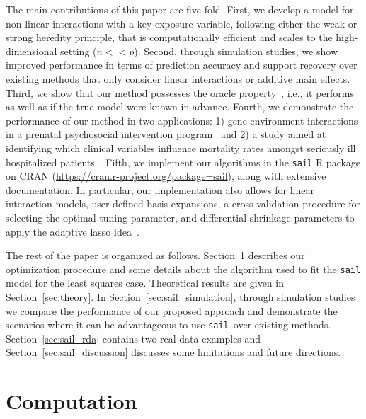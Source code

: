 \documentclass[a4paper,fleqn]{cas-sc}
\newcommand{\sail}{\texttt{sail}}
\begin{document}
The main contributions of this paper are five-fold.
First, we develop a model for non-linear interactions with a key exposure variable, following either the weak or strong heredity principle, that is computationally efficient and scales to the high-dimensional setting ($n << p$).
Second, through simulation studies, we show improved performance in terms of prediction accuracy and support recovery over existing methods that only consider linear interactions or additive main effects.
Third, we show that our method possesses the oracle property~\citep{fan2001variable}, i.e., it performs as well as if the true model were known in advance.
Fourth, we demonstrate the performance of our method in two applications: 1) gene-environment interactions in a prenatal psychosocial intervention program~\cite{olds1998long} and 2) a study aimed at identifying which clinical variables influence mortality rates amongst seriously ill hospitalized patients~\citep{connors1995controlled}.
Fifth, we implement our algorithms in the \texttt{sail} R package on CRAN (\url{https://cran.r-project.org/package=sail}), along with extensive documentation. 
In particular, our implementation also allows for linear interaction models, user-defined basis expansions, a cross-validation procedure for selecting the optimal tuning parameter, and differential shrinkage parameters to apply the adaptive lasso idea~\citep{zou2006adaptive}.

The rest of the paper is organized as follows. Section~\ref{sec:sail_algorithm} describes our optimization procedure and some details about the algorithm used to fit the \texttt{sail} model for the least squares case. Theoretical results are given in Section~\ref{sec:theory}. In Section~\ref{sec:sail_simulation}, through simulation studies we compare the performance of our proposed approach and demonstrate the scenarios where it can be advantageous to use \sail ~over existing methods. Section~\ref{sec:sail_rda} contains two real data examples and Section~\ref{sec:sail_discussion} discusses some limitations and future directions.


\section{Computation} \label{sec:sail_algorithm}
\end{document}
